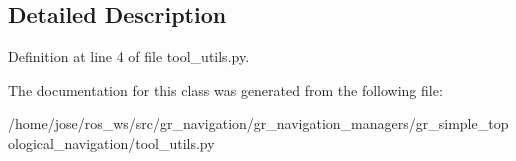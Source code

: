 \subsection{Detailed Description}


Definition at line 4 of file tool\+\_\+utils.\+py.



The documentation for this class was generated from the following file\+:\begin{DoxyCompactItemize}
\item 
/home/jose/ros\+\_\+ws/src/gr\+\_\+navigation/gr\+\_\+navigation\+\_\+managers/gr\+\_\+simple\+\_\+topological\+\_\+navigation/tool\+\_\+utils.\+py\end{DoxyCompactItemize}
